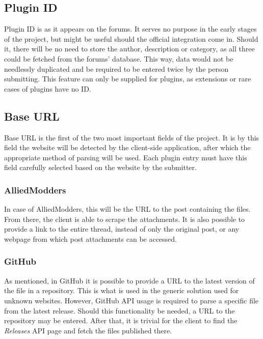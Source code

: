\subsection{Plugin ID}

Plugin ID is as it appears on the forums.
It serves no purpose in the early stages of the project, but might be useful should the official integration come in.
Should it, there will be no need to store the author, description or category, as all three could be fetched from the forums' database.
This way, data would not be needlessly duplicated and be required to be entered twice by the person submitting.
This feature can only be supplied for plugins, as extensions or rare cases of plugins have no ID.

\subsection{Base URL}

Base URL is the first of the two most important fields of the project.
It is by this field the website will be detected by the client-side application, after which the appropriate method of parsing will be used.
Each plugin entry must have this field carefully selected based on the website by the submitter.

\subsubsection{AlliedModders}

In case of AlliedModders, this will be the URL to the post containing the files.
From there, the client is able to scrape the attachments.
It is also possible to provide a link to the entire thread, instead of only the original post, or any webpage from which post attachments can be accessed.

\subsubsection{GitHub}

As mentioned, in GitHub it is possible to provide a URL to the latest version of the file in a repository.
This is what is used in the generic solution used for unknown websites.
However, GitHub API usage is required to parse a specific file from the latest release.
Should this functionality be needed, a URL to the repository may be entered.
After that, it is trivial for the client to find the \textit{Releases} API page and fetch the files published there.

